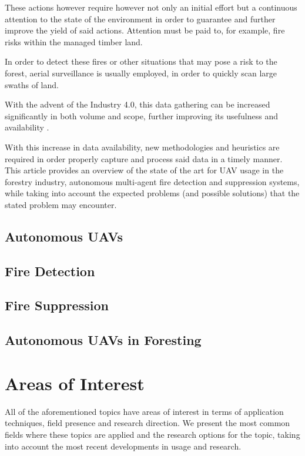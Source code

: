 \documentclass[runningheads]{llncs}
\begin{document}
These actions however require however not only an initial effort but a continuous attention to the state of the environment in order to guarantee and further improve the yield of said actions. Attention must be paid to, for example, fire risks within the managed timber land. 

In order to detect these fires or other situations that may pose a risk to the forest, aerial surveillance is usually employed, in order to quickly scan large swaths of land. 

With the advent of the Industry 4.0, this data gathering can be increased significantly in both volume and scope, further improving its usefulness and availability \cite{Hood_Brady_2016}.

With this increase in data availability, new methodologies and heuristics are required in order properly capture and process said data in a timely manner. This article provides an overview of the state of the art for UAV usage in the forestry industry, autonomous multi-agent fire detection and suppression systems, while taking into account the expected problems (and possible solutions) that the stated problem may encounter.

\subsection{Autonomous UAVs}


\subsection{Fire Detection}



\subsection{Fire Suppression}


\subsection{Autonomous UAVs in Foresting}


\section{Areas of Interest}

All of the aforementioned topics have areas of interest in terms of application techniques, field presence and research direction. We present the most common fields where these topics are applied and the research options for the topic, taking into account the most recent developments in usage and research.
\end{document}

